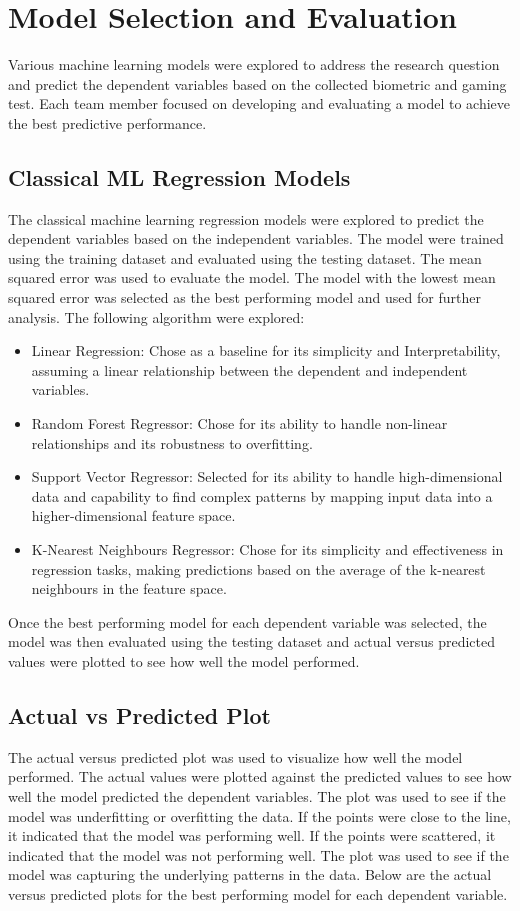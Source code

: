 \section{Model Selection and Evaluation}
Various machine learning models were explored to address the research question and predict the dependent variables based on the collected biometric and gaming test. Each team member
focused on developing and evaluating a model to achieve the best predictive performance. 

\subsection{Classical ML Regression Models}
The classical machine learning regression models were explored to predict the dependent variables based on the independent variables. The model were trained using the training dataset 
and evaluated using the testing dataset. The mean squared error was used to evaluate the model. The model with the lowest mean squared error was selected as the best performing model and 
used for further analysis. The following algorithm were explored:

\begin{itemize}
    \item Linear Regression: Chose as a baseline for its simplicity and Interpretability, assuming a linear relationship between the dependent and independent variables.
    \item Random Forest Regressor: Chose for its ability to handle non-linear relationships and its robustness to overfitting. 
    \item Support Vector Regressor: Selected for its ability to handle high-dimensional data and capability to find complex patterns by mapping input data into a higher-dimensional feature space.
    \item K-Nearest Neighbours Regressor: Chose for its simplicity and effectiveness in regression tasks, making predictions based on the average of the k-nearest neighbours in the feature space.
\end{itemize}

Once the best performing model for each dependent variable was selected, the model was then evaluated using the testing dataset and actual versus predicted values were plotted to see
how well the model performed. 

\subsection{Actual vs Predicted Plot}
The actual versus predicted plot was used to visualize how well the model performed. The actual values were plotted against the predicted values to see how well the model predicted the
dependent variables. The plot was used to see if the model was underfitting or overfitting the data. If the points were close to the line, it indicated that the model was performing well.
If the points were scattered, it indicated that the model was not performing well. The plot was used to see if the model was capturing the underlying patterns in the data. Below are the 
actual versus predicted plots for the best performing model for each dependent variable.

